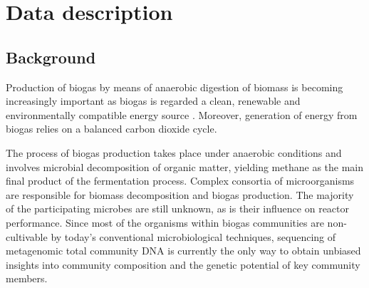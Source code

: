 \documentclass{bmcart}
\begin{document}
\begin{frontmatter}
\begin{abstractbox}
\begin{keyword}
\end{keyword}


\end{abstractbox}
%

\end{frontmatter}



\section*{Data description}

\subsection*{Background}
Production of biogas by means of anaerobic digestion of biomass is becoming increasingly important as biogas is regarded a clean, renewable and environmentally compatible energy source \cite{Weiland2010}. Moreover, generation of energy from biogas relies on a balanced carbon dioxide cycle.

The process of biogas production takes place under anaerobic conditions and involves microbial decomposition of organic matter, yielding methane as the main final product of the fermentation process. Complex consortia of microorganisms are responsible for biomass decomposition and biogas production.
The majority of the participating microbes are still unknown, as is their influence on reactor performance. Since most of the organisms within biogas communities are non-cultivable by today’s conventional microbiological techniques, sequencing of metagenomic total community DNA is currently the only way to obtain unbiased insights into community composition and the genetic potential of key community members.
\end{document}
